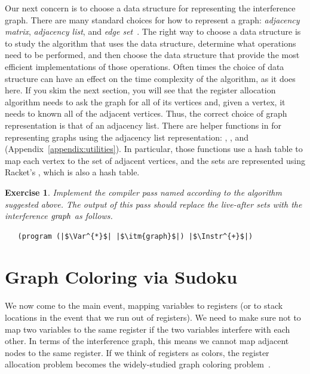 \documentclass[11pt]{book}
\newtheorem{exercise}[theorem]{Exercise}
\begin{document}
Our next concern is to choose a data structure for representing the
interference graph. There are many standard choices for how to
represent a graph: \emph{adjacency matrix}, \emph{adjacency list}, and
\emph{edge set}~\citep{Cormen:2001uq}. The right way to choose a data
structure is to study the algorithm that uses the data structure,
determine what operations need to be performed, and then choose the
data structure that provide the most efficient implementations of
those operations. Often times the choice of data structure can have an
effect on the time complexity of the algorithm, as it does here. If
you skim the next section, you will see that the register allocation
algorithm needs to ask the graph for all of its vertices and, given a
vertex, it needs to known all of the adjacent vertices. Thus, the
correct choice of graph representation is that of an adjacency
list. There are helper functions in  for
representing graphs using the adjacency list representation:
, , and 
(Appendix~\ref{appendix:utilities}).  In particular, those functions
use a hash table to map each vertex to the set of adjacent vertices,
and the sets are represented using Racket's , which is also a
hash table.

\begin{exercise}\normalfont
Implement the compiler pass named  according
to the algorithm suggested above.  The output of this pass should
replace the live-after sets with the interference $\mathit{graph}$ as
follows.
\begin{lstlisting}
   (program (|$\Var^{*}$| |$\itm{graph}$|) |$\Instr^{+}$|)
\end{lstlisting}

\end{exercise}

\section{Graph Coloring via Sudoku}
\label{sec:graph-coloring}

We now come to the main event, mapping variables to registers (or to
stack locations in the event that we run out of registers).  We need
to make sure not to map two variables to the same register if the two
variables interfere with each other.  In terms of the interference
graph, this means we cannot map adjacent nodes to the same register.
If we think of registers as colors, the register allocation problem
becomes the widely-studied graph coloring
problem~\citep{Balakrishnan:1996ve,Rosen:2002bh}.
\end{document}
